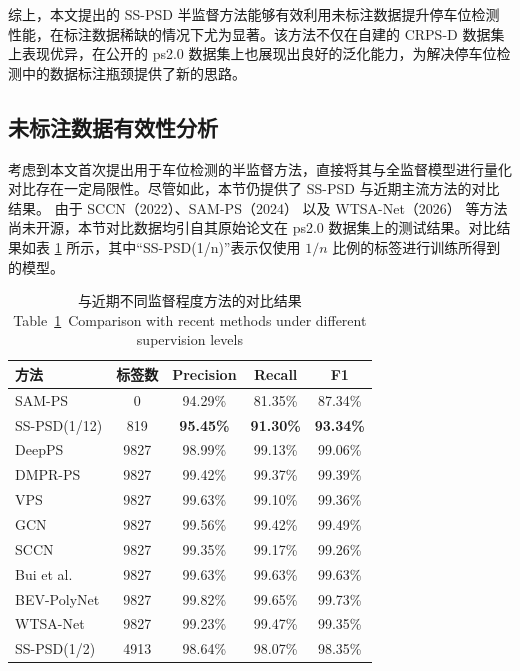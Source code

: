 综上，本文提出的 SS-PSD 半监督方法能够有效利用未标注数据提升停车位检测性能，在标注数据稀缺的情况下尤为显著。该方法不仅在自建的 CRPS-D 数据集上表现优异，在公开的 ps2.0 数据集上也展现出良好的泛化能力，为解决停车位检测中的数据标注瓶颈提供了新的思路。


\subsection{未标注数据有效性分析}

考虑到本文首次提出用于车位检测的半监督方法，直接将其与全监督模型进行量化对比存在一定局限性。尽管如此，本节仍提供了 SS-PSD 与近期主流方法的对比结果。
由于 SCCN（2022）\cite{zheng2022center}、SAM-PS（2024）\cite{zhai2024sam} 以及 WTSA-Net（2026）\cite{li2026parking} 等方法尚未开源，本节对比数据均引自其原始论文在 ps2.0 数据集上的测试结果。对比结果如表 \ref{tab_recent} 所示，其中“SS-PSD(1/n)”表示仅使用 $1/n$ 比例的标签进行训练所得到的模型。

\begin{table}[ht]
\centering
\setlength{\tabcolsep}{6mm}
\caption{与近期不同监督程度方法的对比结果 \\
Table~\ref{tab_recent}~Comparison with recent methods under different supervision levels}
\begin{tabular}{lcccc}
\toprule
    方法 & 标签数 &  Precision & Recall & F1 \\
\midrule
    SAM-PS\cite{zhai2024sam} & 0  & 94.29\% & 81.35\% & 87.34\% \\
    SS-PSD(1/12) & 819  & \textbf{95.45\%} & \textbf{91.30\%} & \textbf{93.34\%} \\
\midrule
       DeepPS\cite{zhang2018vision}  & 9827  & 98.99\% & 99.13\% & 99.06\% \\
       DMPR-PS\cite{huang2019dmpr} & 9827  & 99.42\% & 99.37\% & 99.39\% \\
       VPS\cite{li2020vacant}  & 9827  & 99.63\% & 99.10\% & 99.36\% \\
       GCN\cite{min2021attentional}  & 9827  & 99.56\% & 99.42\% & 99.49\%\\
       SCCN \cite{zheng2022center}  & 9827  & 99.35\% & 99.17\% & 99.26\% \\
       Bui et al.\cite{bui2023one} & 9827  &  99.63\% & 99.63\% & 99.63\% \\
       BEV-PolyNet\cite{duan2025bev} & 9827  &  99.82\% & 99.65\% & 99.73\% \\
       WTSA-Net\cite{li2026parking} & 9827  &  99.23\% & 99.47\% & 99.35\% \\
       SS-PSD(1/2) & 4913   & 98.64\% & 98.07\% & 98.35\%\\
\bottomrule
\end{tabular}
\label{tab_recent}
\end{table}

